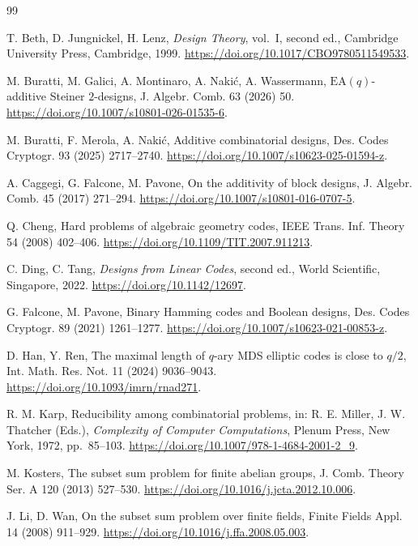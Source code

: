 \documentclass[11pt]{article}
\theoremstyle{definition}
\begin{document}
\begin{thebibliography}{99}
	
	T. Beth, D. Jungnickel, H. Lenz,
	\textit{Design Theory}, vol.~I, second ed.,
	Cambridge University Press, Cambridge, 1999.
	\url{https://doi.org/10.1017/CBO9780511549533}.
	
	M. Buratti, M. Galici, A. Montinaro, A. Naki\'c, A. Wassermann,
	$\mathrm{EA}(q)$-additive Steiner $2$-designs,
	J. Algebr. Comb. 63 (2026) 50.
	\url{https://doi.org/10.1007/s10801-026-01535-6}.
	
	M. Buratti, F. Merola, A. Naki\'c,
	Additive combinatorial designs,
	Des. Codes Cryptogr. 93 (2025) 2717--2740.
	\url{https://doi.org/10.1007/s10623-025-01594-z}.
	

	
	A. Caggegi, G. Falcone, M. Pavone,
	On the additivity of block designs,
	J. Algebr. Comb. 45 (2017) 271--294.
	\url{https://doi.org/10.1007/s10801-016-0707-5}.
	
	Q. Cheng,
	Hard problems of algebraic geometry codes,
	IEEE Trans. Inf. Theory 54 (2008) 402--406.
	\url{https://doi.org/10.1109/TIT.2007.911213}.
	
	C. Ding, C. Tang,
	\textit{Designs from Linear Codes}, second ed.,
	World Scientific, Singapore, 2022.
	\url{https://doi.org/10.1142/12697}.
	
	G. Falcone, M. Pavone,
	Binary Hamming codes and Boolean designs,
	Des. Codes Cryptogr. 89 (2021) 1261--1277.
	\url{https://doi.org/10.1007/s10623-021-00853-z}.
	
D. Han, Y. Ren,
The maximal length of $q$-ary MDS elliptic codes is close to $q/2$,
Int. Math. Res. Not. 11 (2024) 9036--9043.
\url{https://doi.org/10.1093/imrn/rnad271}.

R. M. Karp,
Reducibility among combinatorial problems,
in: R. E. Miller, J. W. Thatcher (Eds.),
\textit{Complexity of Computer Computations},
Plenum Press, New York, 1972, pp.~85--103.
\url{https://doi.org/10.1007/978-1-4684-2001-2_9}.


	M. Kosters,
	The subset sum problem for finite abelian groups,
	J. Comb. Theory Ser. A 120 (2013) 527--530.
	\url{https://doi.org/10.1016/j.jcta.2012.10.006}.
	
	J. Li, D. Wan,
	On the subset sum problem over finite fields,
	Finite Fields Appl. 14 (2008) 911--929.
	\url{https://doi.org/10.1016/j.ffa.2008.05.003}.
	

\end{thebibliography}
\end{document}
